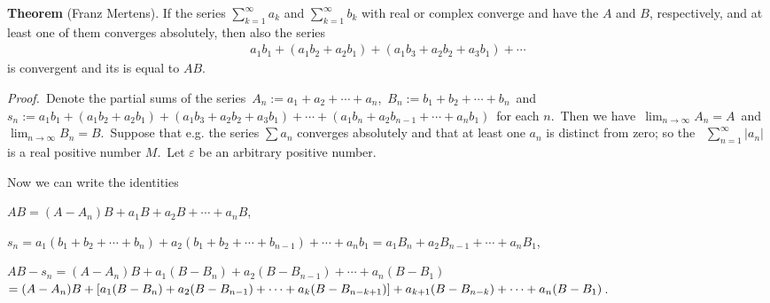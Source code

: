 \documentclass[12pt]{article}
\theoremstyle{definition}
\begin{document}
\textbf{Theorem} (Franz Mertens).
If the series $\sum_{k=1}^\infty a_k$ and $\sum_{k=1}^\infty b_k$ with real or complex  converge and have the  $A$ and $B$, respectively, and at least one of them converges absolutely, then also the series
\begin{align}
a_1b_1\!+\!(a_1b_2\!+\!a_2b_1)\!+\!(a_1b_3\!+\!a_2b_2\!+\!a_3b_1)\!+\cdots
\end{align}
is convergent and its  is equal to $AB$.

{\em Proof.}\, Denote the partial sums of the series\, $A_n := a_1+a_2+\cdots+a_n$,\, $B_n := b_1+b_2+\cdots+b_n$\, and\, 
$s_n := a_1b_1+(a_1b_2+a_2b_1)+(a_1b_3+a_2b_2+a_3b_1)+\cdots
+(a_1b_n+a_2b_{n-1}+\cdots+a_nb_1)$\, for each $n$.\, Then we have\, $\lim_{n\to\infty}A_n = A$\, and\, $\lim_{n\to\infty}B_n = B$.\, Suppose that e.g. the series $\sum a_n$ converges absolutely and that at least one $a_n$ is distinct from zero; so the \, $\sum_{n=1}^\infty|a_n|$ is a real positive number $M$.\, Let $\varepsilon$ be an arbitrary positive number.

Now we can write the identities

$AB = (A-A_n)B+a_1B+a_2B+\cdots+a_nB$,

$s_n = a_1(b_1+b_2+\cdots+b_n)+a_2(b_1+b_2+\cdots+b_{n-1})+\cdots+a_nb_1 =
  a_1B_n+a_2B_{n-1}+\cdots+a_nB_1$,

$AB\!-\!s_n = (A-A_n)B+a_1(B-B_n)+a_2(B-B_{n-1})+\cdots+a_n(B-B_1)$\\
$= (A-A_n)B+[a_1(B-B_n)+a_2(B-B_{n-1})+\cdots+a_k(B-B_{n-k+1})]\\
+a_{k+1}(B-B_{n-k})+\cdots+a_n(B-B_1)$.
\end{document}
